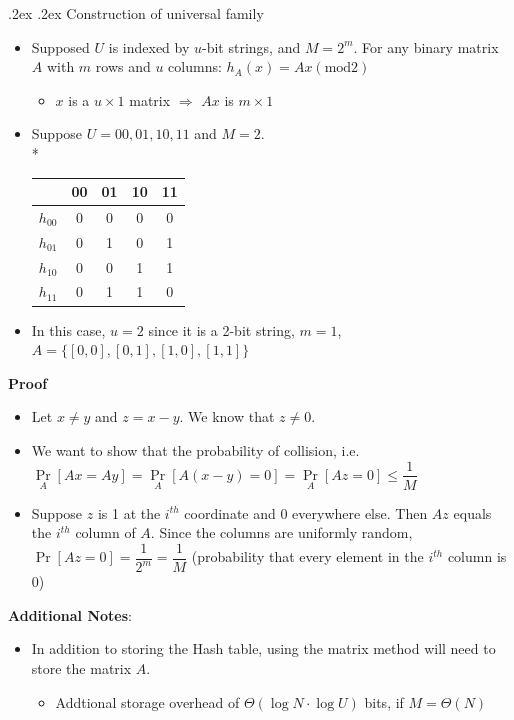 \documentclass[10pt,landscape,a4paper]{article}
\makeatletter
\newenvironment{tightcenter}{%
	\setlength\topsep{0pt}
	\setlength\parskip{0pt}
	\begin{center}
	}{%
	\end{center}
}
\renewcommand{\subsubsection}{\@startsection{subsubsection}{1}{0mm}%
    {.2ex}%
    {.2ex}%
    {\rmfamily\bfseries}}
\makeatother
\begin{document}
\begin{multicols*}{4}
	\subsubsection{Construction of universal family}
	\begin{itemize}
		\item Supposed $U$ is indexed by $ u $-bit strings, and $ M=2^m $. For any binary matrix $ A $ with $ m $ rows and $ u $ columns: $h_A(x)=Ax(\text{mod}2)$
		\begin{itemize}
			\item $ x $ is a $ u\times1 $ matrix $\Rightarrow$ $ Ax $ is $ m\times1 $
		\end{itemize}
		\item Suppose $ U={00,01,10,11} $ and $ M=2 $.
		\\*
		\begin{tightcenter}
			{
			\begin{tabular}
				{ccccc}
				\rowcolor{cyan!10} 
				\hline
				\, & 00 & 01 & 10 & 11 \\\hline
				$h_{00}$ & 0 & 0 & 0 & 0 \\
				$h_{01}$ & 0 & 1 & 0 & 1 \\
				$h_{10}$ & 0 & 0 & 1 & 1 \\
				$h_{11}$ & 0 & 1 & 1 & 0 \\\hline
			\end{tabular}
			}
		\end{tightcenter} 
		\item In this case, $u=2$ since it is a 2-bit string, $m=1$, $A=\{[0,0], [0,1], [1,0], [1,1]\}$
	\end{itemize}
	\vfill\null\columnbreak
	\textbf{Proof}
	\begin{itemize}
		\item Let $x\neq y$ and $z=x-y$. We know that $z\neq 0$.
		\item We want to show that the probability of collision, i.e. $\Pr\limits_{A}[Ax=Ay] = \Pr\limits_{A}[A(x-y)=0]=\Pr\limits_{A}[Az=0]\leq \dfrac{1}{M}$ 
		\item Suppose $z$ is 1 at the $i^{th}$ coordinate and 0 everywhere else. Then $Az$ equals the $i^{th}$ column of $A$. Since the columns are uniformly random, $\Pr[Az=0]=\dfrac{1}{2^m}=\dfrac{1}{M}$ (probability that every element in the $i^{th}$ column is 0)
	\end{itemize}
	\textbf{Additional Notes}:
	\begin{itemize}
		\item In addition to storing the Hash table, using the matrix method will need to store the matrix $A$.
		\begin{itemize}
			\item Addtional storage overhead of $\Theta(\log N\cdot \log U)$ bits, if $M=\Theta(N)$
		\end{itemize}
	\end{itemize}

\end{multicols*}
\end{document}
